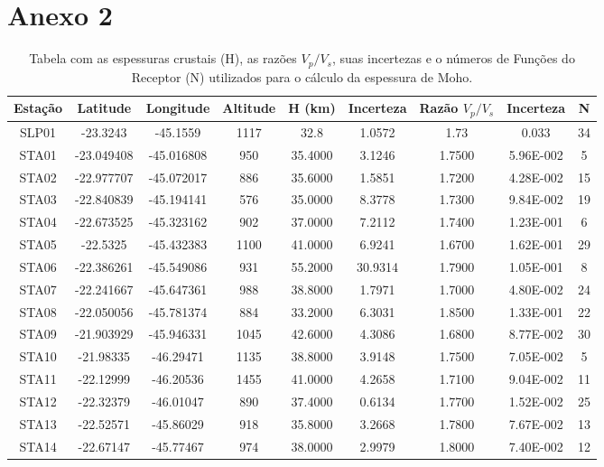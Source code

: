 \chapter*{Anexo 2}
\begin{table}[!Ht]
\small
\caption{Tabela com as espessuras crustais (H), as razões $V_{p}/V_{s}$, suas incertezas e o números de Funções do Receptor (N) utilizados para o cálculo da espessura de Moho.}
\begin{tabular}{| c | c | c | c | c | c | c | c | c |}
\hline
{\textbf{Estação}} & {\textbf{Latitude}} & {\textbf{Longitude}} & {\textbf{Altitude}} & {\textbf{H (km)}} & {\textbf{Incerteza}} & {\textbf{Razão $V_{p}/V_{s}$}} & {\textbf{Incerteza}} & {\textbf{N}}\\
\hline 
SLP01 & -23.3243 & -45.1559 & 1117 & 32.8 & 1.0572 & 1.73 & 0.033 & 34\\
STA01 & -23.049408 & -45.016808 & 950 & 35.4000 & 3.1246 & 1.7500 & 5.96E-002 & 5\\
STA02 & -22.977707 & -45.072017 & 886 & 35.6000 & 1.5851 & 1.7200 & 4.28E-002 & 15\\
STA03 & -22.840839 & -45.194141 & 576 & 35.0000 & 8.3778 & 1.7300 & 9.84E-002 & 19\\
STA04 & -22.673525 & -45.323162 & 902 & 37.0000 & 7.2112 & 1.7400 & 1.23E-001 & 6\\
STA05 & -22.5325 & -45.432383 & 1100 & 41.0000 & 6.9241 & 1.6700 & 1.62E-001 & 29\\
STA06 & -22.386261 & -45.549086 & 931 & 55.2000 & 30.9314 & 1.7900 & 1.05E-001 & 8\\
STA07 & -22.241667 & -45.647361 & 988 & 38.8000 & 1.7971 & 1.7000 & 4.80E-002 & 24\\
STA08 & -22.050056 & -45.781374 & 884 & 33.2000 & 6.3031 & 1.8500 & 1.33E-001 & 22\\
STA09 & -21.903929 & -45.946331 & 1045 & 42.6000 & 4.3086 & 1.6800 & 8.77E-002 & 30\\
STA10 & -21.98335 & -46.29471 & 1135 & 38.8000 & 3.9148 & 1.7500 & 7.05E-002 & 5\\
STA11 & -22.12999 & -46.20536 & 1455 & 41.0000 & 4.2658 & 1.7100 & 9.04E-002 & 11\\
STA12 & -22.32379 & -46.01047 & 890 & 37.4000 & 0.6134 & 1.7700 & 1.52E-002 & 25\\
STA13 & -22.52571 & -45.86029 & 918 & 35.8000 & 3.2668 & 1.7800 & 7.67E-002 & 13\\
STA14 & -22.67147 & -45.77467 & 974 & 38.0000 & 2.9979 & 1.8000 & 7.40E-002 & 12\\

\end{tabular}
\end{table}
